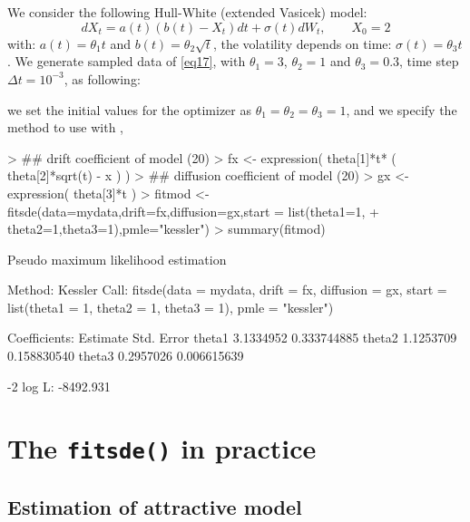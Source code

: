 We consider the following Hull-White (extended Vasicek) model:
\begin{equation}\label{eq17}
  dX_{t} = a(t)(b(t)-X_{t}) dt + \sigma(t) dW_{t},\qquad X_{0}=2
\end{equation}
with: $a(t) = \theta_{1}t$ and $b(t)=\theta_{2}\sqrt{t}$, the volatility depends on time: $\sigma(t)=\theta_{3}t$. We generate sampled data of \eqref{eq17}, with $\theta_{1}=3$, $\theta_{2}=1$ and $\theta_{3}=0.3$, time step $\Delta t =10^{-3}$, as following:
\begin{Schunk}
\end{Schunk}
we set the initial values for the optimizer as $\theta_{1}=\theta_{2}=\theta_{3}=1$, and we specify the method to use with ,
\begin{Schunk}
\begin{Sinput}
> ## drift coefficient of model (20)
> fx <- expression( theta[1]*t* ( theta[2]*sqrt(t) - x ) )
> ## diffusion coefficient of model (20)
> gx <- expression( theta[3]*t )
> fitmod <- fitsde(data=mydata,drift=fx,diffusion=gx,start = list(theta1=1,
+                  theta2=1,theta3=1),pmle="kessler")
> summary(fitmod)
\end{Sinput}
\begin{Soutput}
Pseudo maximum likelihood estimation

Method:  Kessler
Call:
fitsde(data = mydata, drift = fx, diffusion = gx, start = list(theta1 = 1,
    theta2 = 1, theta3 = 1), pmle = "kessler")

Coefficients:
        Estimate  Std. Error
theta1 3.1334952 0.333744885
theta2 1.1253709 0.158830540
theta3 0.2957026 0.006615639

-2 log L: -8492.931
\end{Soutput}
\end{Schunk}
\section{The \texttt{fitsde()} in practice}

\subsection{Estimation of attractive model}

